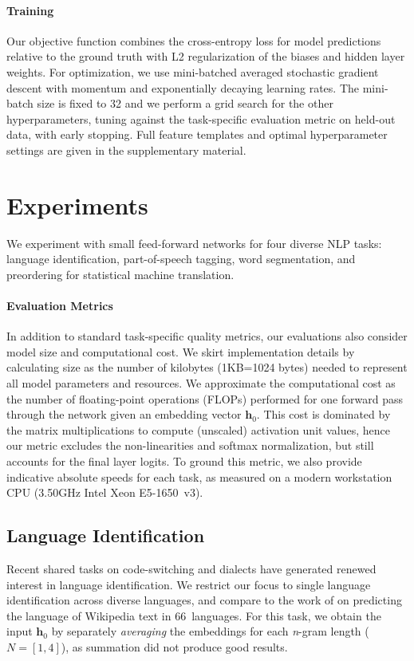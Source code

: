 \documentclass[11pt,letterpaper]{article}
\newcommand{\kgram}[1]{{\it #1}-gram}
\newcommand{\ngram}{\kgram{n}}
\begin{document}
\paragraph{Training}
Our objective function combines the cross-entropy loss for model predictions relative to the ground truth with L2 regularization of the biases and hidden layer weights.
For optimization, we use mini-batched averaged stochastic gradient descent with momentum \cite{bottou2010sgd,momentum} and exponentially decaying learning rates.
The mini-batch size is fixed to 32 and we perform a grid search for the other hyperparameters, tuning against the task-specific evaluation metric on held-out data, with early stopping.
Full feature templates and optimal hyperparameter settings are given in the supplementary material.

\section{Experiments}
We experiment with small feed-forward networks for 
four diverse NLP tasks: language identification, part-of-speech tagging,
word segmentation, and preordering for statistical machine translation.

\paragraph{Evaluation Metrics}\label{sec:metrics}
In addition to standard task-specific quality metrics, our evaluations also consider model size and computational cost.
We skirt implementation details by calculating size as the number of kilobytes (1KB=1024 bytes) needed to represent all model parameters and resources.
We approximate the computational cost
as the number of floating-point operations (FLOPs) performed for one forward pass through the network given an embedding vector $\mathbf{h}_0$.
This cost is dominated by the matrix multiplications to compute (unscaled) activation unit values,
hence our metric excludes the non-linearities and softmax normalization, but still accounts for the final layer logits.
To ground this metric, we also provide indicative absolute speeds for each task, as measured on a modern workstation CPU (3.50GHz Intel Xeon E5-1650~v3).

\subsection{Language Identification}
\label{sec:langid}
Recent shared tasks on code-switching \cite{molina-codeswitched-task} and dialects \cite{malmasi-EtAl:2016:VarDial3} have generated renewed interest in language identification.
We restrict our focus to single language identification across diverse languages, and
compare to the work of 
on predicting the language of Wikipedia text in 66~languages.
For this task, we obtain the input $\mathbf{h}_0$ by separately \emph{averaging} the embeddings for each \ngram{} length ($N=[1,4]$), as summation did not produce good results.
\end{document}

